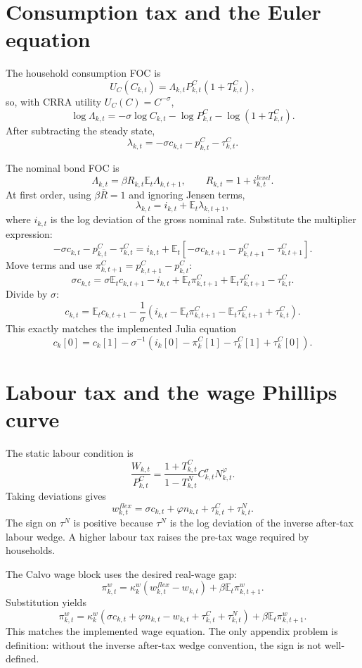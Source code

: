 \documentclass[11pt]{article}
\newcommand{\E}{\mathbb E}
\newcommand{\TC}{T^C}
\newcommand{\TN}{T^N}
\newcommand{\tauc}{\tau^C}
\newcommand{\taun}{\tau^N}
\newcommand{\Pc}{P^C}
\begin{document}
\section{Consumption tax and the Euler equation}

The household consumption FOC is
\[
  U_C(C_{k,t})=\Lambda_{k,t}\Pc_{k,t}(1+\TC_{k,t}),
\]
so, with CRRA utility \(U_C(C)=C^{-\sigma}\),
\[
  \log \Lambda_{k,t}
  =
  -\sigma \log C_{k,t}
  -\log \Pc_{k,t}
  -\log(1+\TC_{k,t}).
\]
After subtracting the steady state,
\[
  \lambda_{k,t}=-\sigma c_{k,t}-p^C_{k,t}-\tauc_{k,t}.
\]

The nominal bond FOC is
\[
  \Lambda_{k,t}
  =
  \beta R_{k,t}\E_t\Lambda_{k,t+1},
  \qquad R_{k,t}=1+i^{level}_{k,t}.
\]
At first order, using \(\beta \bar R=1\) and ignoring Jensen terms,
\[
  \lambda_{k,t}
  =
  i_{k,t}+\E_t\lambda_{k,t+1},
\]
where \(i_{k,t}\) is the log deviation of the gross nominal rate. Substitute the
multiplier expression:
\[
  -\sigma c_{k,t}-p^C_{k,t}-\tauc_{k,t}
  =
  i_{k,t}
  +\E_t[-\sigma c_{k,t+1}-p^C_{k,t+1}-\tauc_{k,t+1}].
\]
Move terms and use \(\pi^C_{k,t+1}=p^C_{k,t+1}-p^C_{k,t}\):
\[
  \sigma c_{k,t}
  =
  \sigma \E_t c_{k,t+1}
  -i_{k,t}
  +\E_t\pi^C_{k,t+1}
  +\E_t\tauc_{k,t+1}
  -\tauc_{k,t}.
\]
Divide by \(\sigma\):
\[
  c_{k,t}
  =
  \E_t c_{k,t+1}
  -\frac{1}{\sigma}
  \left(
    i_{k,t}
    -\E_t\pi^C_{k,t+1}
    -\E_t\tauc_{k,t+1}
    +\tauc_{k,t}
  \right).
\]
This exactly matches the implemented Julia equation
\[
  c_k[0]=c_k[1]-\sigma^{-1}(i_k[0]-\pi^C_k[1]-\tauc_k[1]+\tauc_k[0]).
\]

\section{Labour tax and the wage Phillips curve}

The static labour condition is
\[
  \frac{W_{k,t}}{\Pc_{k,t}}
  =
  \frac{1+\TC_{k,t}}{1-\TN_{k,t}}
  C_{k,t}^{\sigma}N_{k,t}^{\varphi}.
\]
Taking deviations gives
\[
  w^{flex}_{k,t}
  =
  \sigma c_{k,t}
  +\varphi n_{k,t}
  +\tauc_{k,t}
  +\taun_{k,t}.
\]
The sign on \(\taun\) is positive because \(\taun\) is the log deviation of the
inverse after-tax labour wedge. A higher labour tax raises the pre-tax wage
required by households.

The Calvo wage block uses the desired real-wage gap:
\[
  \pi^w_{k,t}
  =
  \kappa^w_k(w^{flex}_{k,t}-w_{k,t})
  +\beta\E_t\pi^w_{k,t+1}.
\]
Substitution yields
\[
  \pi^w_{k,t}
  =
  \kappa^w_k
  \left(
    \sigma c_{k,t}
    +\varphi n_{k,t}
    -w_{k,t}
    +\tauc_{k,t}
    +\taun_{k,t}
  \right)
  +\beta\E_t\pi^w_{k,t+1}.
\]
This matches the implemented wage equation. The only appendix problem is
definition: without the inverse after-tax wedge convention, the sign is not
well-defined.
\end{document}
